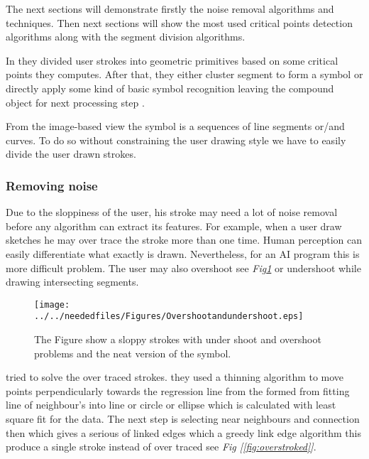 The next sections will demonstrate firstly the noise removal algorithms and techniques. Then next sections will show the most used critical points detection algorithms along with the segment division algorithms. 


  In\cite{sketchRead29} they divided user strokes into geometric primitives based on some critical points they computes.  After that, they either cluster segment to form a symbol   or directly apply some kind of basic symbol recognition leaving the compound object for next processing step .
  
From the image-based view the symbol is a sequences of line segments or/and curves. To do so without constraining the user drawing style we have to easily divide the user drawn strokes.



\subsubsection{Removing noise}
\label{sec:RemovingNoise}

 

Due to the sloppiness of the user, his stroke may need a lot of noise removal before any algorithm can extract its features. For example, when a user draw sketches he may over trace the stroke more than one time. Human perception can easily differentiate what exactly is drawn. Nevertheless, for an AI program this is more difficult problem. The user may also overshoot see \textit{Fig\ref{fig:Overshootandundershoot}} or undershoot while drawing intersecting segments. 
\begin{figure}
	\centering
		\texttt{[image: ../../neededfiles/Figures/Overshootandundershoot.eps]}
	\caption[Neat and Sloppy symbols] {The Figure show a sloppy strokes with under shoot and overshoot problems and the neat version of the symbol.}
	\label{fig:Overshootandundershoot}
\end{figure}


 \cite {overtraced24} tried to solve the over traced strokes. they used a thinning algorithm to move points perpendicularly towards the regression line from the formed from fitting line of neighbour's into line or circle or ellipse which is calculated with least square fit for the data. The next step is selecting near neighbours and connection then which gives a serious of linked edges which a greedy link edge algorithm this produce a single stroke instead of over traced see \textit{Fig [\ref {fig:overstroked}]}.

